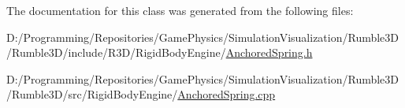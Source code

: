The documentation for this class was generated from the following files\+:\begin{DoxyCompactItemize}
\item 
D\+:/\+Programming/\+Repositories/\+Game\+Physics/\+Simulation\+Visualization/\+Rumble3\+D/\+Rumble3\+D/include/\+R3\+D/\+Rigid\+Body\+Engine/\mbox{\hyperlink{_anchored_spring_8h}{Anchored\+Spring.\+h}}\item 
D\+:/\+Programming/\+Repositories/\+Game\+Physics/\+Simulation\+Visualization/\+Rumble3\+D/\+Rumble3\+D/src/\+Rigid\+Body\+Engine/\mbox{\hyperlink{_anchored_spring_8cpp}{Anchored\+Spring.\+cpp}}\end{DoxyCompactItemize}
